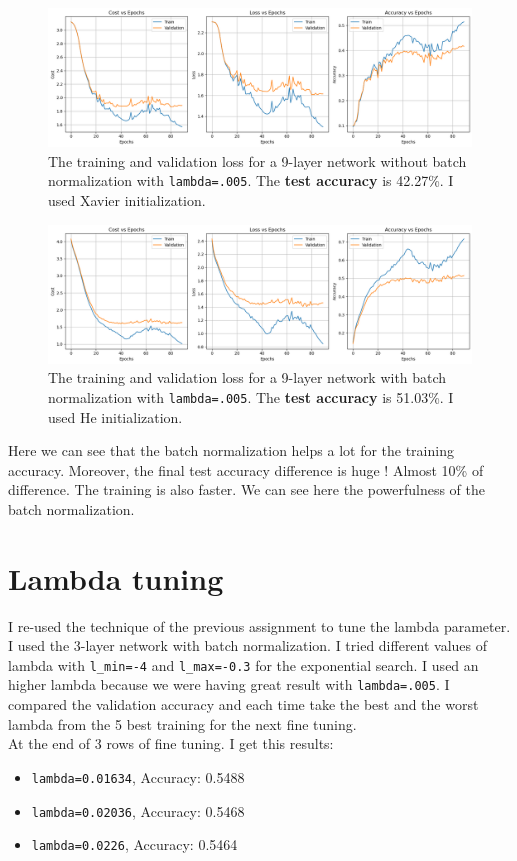 \documentclass{article}
\begin{document}
\begin{figure}[H]
    \centering
    \includegraphics[width=\linewidth]{Result_Pics/9 layer - no BN.png}
    \caption{The training and validation loss for a 9-layer network without batch normalization with \texttt{lambda=.005}. The \textbf{test accuracy} is 42.27\%. I used Xavier initialization.}
\end{figure}

\begin{figure}[H]
    \centering
    \includegraphics[width=\linewidth]{Result_Pics/9 layer - BN.png}
    \caption{The training and validation loss for a 9-layer network with batch normalization with \texttt{lambda=.005}. The \textbf{test accuracy} is 51.03\%. I used He initialization.}
\end{figure}

Here we can see that the batch normalization helps a lot for the training accuracy. Moreover, the final test accuracy difference is huge ! Almost 10\% of difference. The training is also faster. We can see here the powerfulness of the batch normalization. \\

\section*{Lambda tuning}

I re-used the technique of the previous assignment to tune the lambda parameter. I used the 3-layer network with batch normalization. I tried different values of lambda with \texttt{l\_min=-4} and \texttt{l\_max=-0.3} for the exponential search. I used an higher lambda because we were having great result with \texttt{lambda=.005}. I compared the validation accuracy and each time take the best and the worst lambda from the 5 best training for the next fine tuning. \\
At the end of 3 rows of fine tuning. I get this results: \\
\begin{itemize}
    \item \texttt{lambda=0.01634}, Accuracy: 0.5488
    \item \texttt{lambda=0.02036}, Accuracy: 0.5468
    \item \texttt{lambda=0.0226}, Accuracy: 0.5464
\end{itemize}
\end{document}
